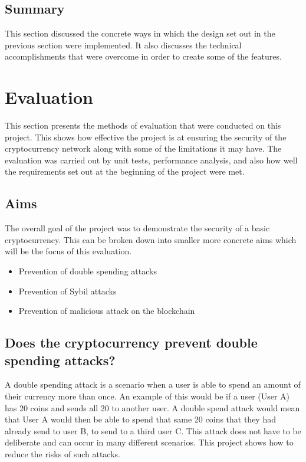 \documentclass{l4proj}
\begin{document}
\section{Summary}
This section discussed the concrete ways in which the design set out in the previous section were implemented.
It also discusses the technical accomplishments that were overcome in order to create some of the features.

\chapter{Evaluation}
This section presents the methods of evaluation that were conducted on this project. This shows how effective the
project is at ensuring the security of the cryptocurrency network along with some of the limitations it may have. 
The evaluation was carried out by unit tests, performance analysis, and also how well the requirements set out at 
the beginning of the project were met.


\section{Aims}
The overall goal of the project was to demonstrate the security of a basic cryptocurrency. This can be broken down into
smaller more concrete aims which will be the focus of this evaluation.
\begin{itemize}
    \item Prevention of double spending attacks
    \item Prevention of Sybil attacks
    \item Prevention of malicious attack on the blockchain
\end{itemize}

\section{Does the cryptocurrency prevent double spending \newline attacks?}
A double spending attack is a scenario when a user is able to spend an amount of their currency more than once. An example
of this would be if a user (User A) has 20 coins and sends all 20 to another user. A double spend attack would mean that User A would
then be able to spend that same 20 coins that they had already send to user B, to send to a third user C. This attack does not have
to be deliberate and can occur in many different scenarios. This project shows how to reduce the risks of such attacks.
\end{document}
